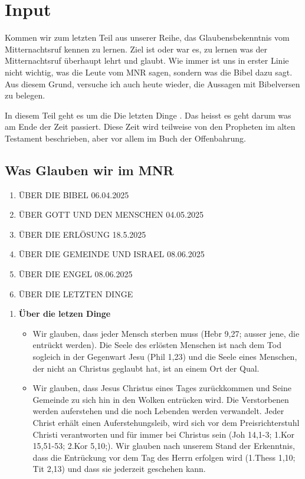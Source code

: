 \documentclass{../../inc/mybib}
\begin{document}
\section{ Input }
\begin{spacing}{1.5}

Kommen wir zum letzten Teil aus unserer Reihe, das Glaubensbekenntnis vom Mitternachtsruf kennen zu lernen. Ziel ist oder war es, zu lernen was der Mitternachtsruf überhaupt lehrt und glaubt. Wie immer ist uns in erster Linie nicht wichtig, was die Leute vom MNR sagen, sondern was die Bibel dazu sagt. Aus diesem Grund, versuche ich auch heute wieder, die Aussagen mit Bibelversen zu belegen.

In diesem Teil geht es um die \flqq Die letzten Dinge \frqq{}. Das heisst es geht darum was am Ende der Zeit passiert. Diese Zeit wird teilweise von den Propheten im alten Testament beschrieben, aber vor allem im Buch der Offenbahrung.

\subsection{Was Glauben wir im MNR}
    \begin{enumerate}
        \item \uppercase{über die bibel} 06.04.2025
        \item \uppercase{über gott und den Menschen} 04.05.2025
        \item \uppercase{über die Erlösung} 18.5.2025
        \item \uppercase{über die Gemeinde und Israel} 08.06.2025
        \item \uppercase{über die Engel} 08.06.2025
        \item \uppercase{über die letzten Dinge}
    \end{enumerate}
    \begin{enumerate}      
      \item \textbf{Über die letzen Dinge} 
        \begin{itemize}
            \item Wir glauben, dass jeder Mensch sterben muss (Hebr 9,27; ausser jene, die entrückt werden). Die Seele des erlösten Menschen ist nach dem Tod sogleich in der Gegenwart Jesu (Phil 1,23) und die Seele eines Menschen, der nicht an Christus geglaubt hat, ist an einem Ort der Qual.

            \item Wir glauben, dass Jesus Christus eines Tages zurückkommen und Seine Gemeinde zu sich hin in den Wolken entrücken wird. Die Verstorbenen werden auferstehen und die noch Lebenden werden verwandelt. Jeder Christ erhält einen Auferstehungsleib, wird sich vor dem Preisrichterstuhl Christi verantworten und für immer bei Christus sein (Joh 14,1-3; 1.Kor 15,51-53; 2.Kor 5,10;). Wir glauben nach unserem Stand der Erkenntnis, dass die Entrückung vor dem Tag des Herrn erfolgen wird (1.Thess 1,10; Tit 2,13) und dass sie jederzeit geschehen kann.
            

\end{itemize}
\end{enumerate}
\end{spacing}
\end{document}
